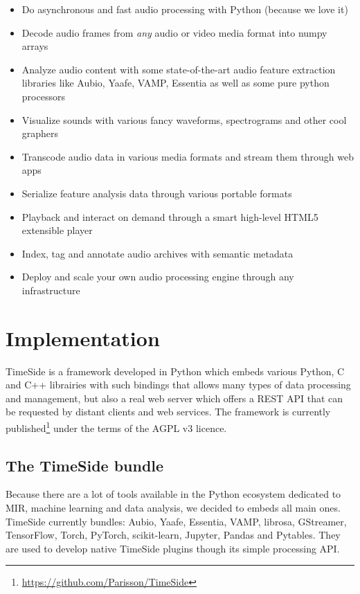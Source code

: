 \documentclass{article}
\begin{document}
\begin{itemize}
 \item Do asynchronous and fast audio processing with Python (because we love it)
 \item Decode audio frames from \textit{any} audio or video media format into numpy arrays
 \item Analyze audio content with some state-of-the-art audio feature extraction libraries like Aubio, Yaafe, VAMP, Essentia as well as some pure python processors
 \item Visualize sounds with various fancy waveforms, spectrograms and other cool graphers
 \item Transcode audio data in various media formats and stream them through web apps
 \item Serialize feature analysis data through various portable formats
 \item Playback and interact on demand through a smart high-level HTML5 extensible player
 \item Index, tag and annotate audio archives with semantic metadata
 \item Deploy and scale your own audio processing engine through any infrastructure
\end{itemize}


\section{Implementation}

TimeSide is a framework developed in Python which embeds various Python, C and C++ librairies with such bindings that allows many types of data processing and management, but also a real web server which offers a REST API that can be requested by distant clients and web services. The framework is currently published\footnote{\tiny{\url{https://github.com/Parisson/TimeSide}}} under the terms of the AGPL v3 licence. 

\subsection{The TimeSide bundle}

Because there are a lot of tools available in the Python ecosystem dedicated to MIR, machine learning and data analysis, we decided to embeds all main ones. TimeSide currently bundles: Aubio\cite{aubio}\cite{BrossierPhD}, Yaafe\cite{yaafe_ISMIR2010}, Essentia\cite{essentia}, VAMP\cite{vamp-plugins}, librosa\cite{librosa}, GStreamer, TensorFlow, Torch, PyTorch, scikit-learn, Jupyter, Pandas and Pytables. They are used to develop native TimeSide plugins though its simple processing API.
\end{document}
